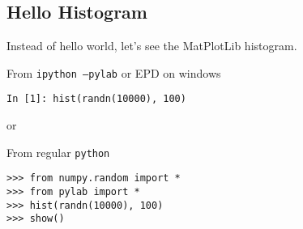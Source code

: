 \subsection*{Hello Histogram}

\begin{frame}[fragile]
Instead of hello world, let's see the MatPlotLib histogram.
\begin{block}{From {\tt ipython --pylab} or EPD on windows}
\begin{verbatim}
In [1]: hist(randn(10000), 100)
\end{verbatim}
\end{block}

or

\begin{block}{From regular {\tt python}}
\begin{verbatim}
>>> from numpy.random import *
>>> from pylab import *
>>> hist(randn(10000), 100)
>>> show()
\end{verbatim}
\end{block}

\end{frame}
